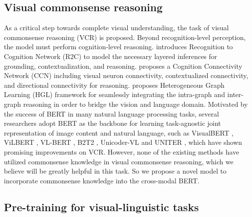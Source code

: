 \documentclass[conference]{IEEEtran}
\begin{document}
\subsection{Visual commonsense reasoning}
As a critical step towards complete visual understanding, the task of visual commonsense reasoning (VCR) is proposed. Beyond recognition-level perception, the model must perform cognition-level reasoning. \cite{b10} introduces Recognition to Cognition Network (R2C) to model the necessary layered inferences for grounding, contextualization, and reasoning. \cite{b17} proposes a Cognition Connectivity Network (CCN)  including visual neuron connectivity, contextualized connectivity, and directional connectivity for reasoning. \cite{b18} proposes Heterogeneous Graph Learning (HGL) framework for seamlessly integrating the intra-graph and inter-graph reasoning in order to bridge the vision and language domain. Motivated by the success of BERT \cite{b11} in many natural language processing tasks, several researchers adopt BERT as the backbone for learning task-agnostic joint representation of image content and natural language, such as VisualBERT \cite{b12}, ViLBERT \cite{b13}, VL-BERT \cite{b14}, B2T2 \cite{b15}, Unicoder-VL \cite{b19} and UNITER \cite{b20}, which have shown promising improvements on VCR. However, none of the existing methods have utilized commonsense knowledge in visual commonsense reasoning, which we believe will be greatly helpful in this task. So we propose a novel model to incorporate commonsense knowledge into the cross-modal BERT.

\subsection{Pre-training for visual-linguistic tasks}
\end{document}
